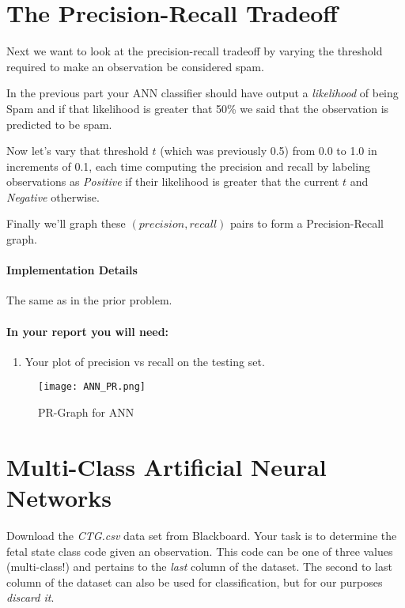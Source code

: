 \documentclass[12pt]{article}
\begin{document}
\newpage

\section{The Precision-Recall Tradeoff}\label{naive}
Next we want to look at the precision-recall tradeoff by varying the threshold required to make an observation be considered spam.\\
\noindent

In the previous part your ANN classifier should have output a \emph{likelihood} of being Spam and if that likelihood is greater that 50\% we said that the observation is predicted to be spam.\\
\noindent

Now let's vary that threshold $t$ (which was previously 0.5) from 0.0 to 1.0 in increments of 0.1, each time computing the precision and recall by labeling observations as \emph{Positive} if their likelihood is greater that the current $t$ and \emph{Negative} otherwise.\\
\noindent

Finally we'll graph these $(precision, recall)$ pairs to form a Precision-Recall graph.

\paragraph{Implementation Details}
The same as in the prior problem.

\paragraph{In your report you will need:}
\begin{enumerate}
\item Your plot of precision vs recall on the testing set.
\end{enumerate}

\begin{figure}[H]
\begin{center}
\texttt{[image: ANN\_PR.png]}
\caption{PR-Graph for ANN}
\end{center}
\end{figure}

\section{Multi-Class Artificial Neural Networks}
Download the \emph{CTG.csv} data set from Blackboard.  Your task is to determine the fetal state class code given an observation.  This code can be one of three values (multi-class!) and pertains to the \emph{last} column of the dataset.  The second to last column of the dataset can also be used for classification, but for our purposes \emph{discard it}.\\
\end{document}
